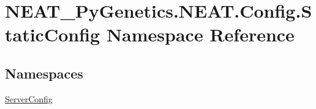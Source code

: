 \hypertarget{namespaceNEAT__PyGenetics_1_1NEAT_1_1Config_1_1StaticConfig}{}\section{N\+E\+A\+T\+\_\+\+Py\+Genetics.\+N\+E\+A\+T.\+Config.\+Static\+Config Namespace Reference}
\label{namespaceNEAT__PyGenetics_1_1NEAT_1_1Config_1_1StaticConfig}
\subsection*{Namespaces}
\begin{DoxyCompactItemize}
\item 
 \hyperlink{namespaceNEAT__PyGenetics_1_1NEAT_1_1Config_1_1StaticConfig_1_1ServerConfig}{Server\+Config}
\end{DoxyCompactItemize}
